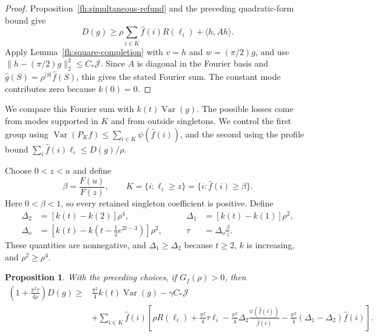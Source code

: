 \documentclass[11pt,letterpaper]{amsart}
\newcommand{\1}{\mathbf 1}
\DeclareMathOperator{\Var}{Var}
\newtheorem{proposition}[theorem]{Proposition}
\numberwithin{equation}{section}
\begin{document}
\begin{proof}
Proposition~\ref{fh:simultaneous-refund} and the preceding
quadratic-form bound give
\[
 D(g)\ge
 \rho\sum_{i\in K}\widehat f(i)R(\ell_i)+\langle h,Ah\rangle.
\]
Apply Lemma~\ref{fh:square-completion} with
$v=h$ and $w=(\pi/2)g$, and use
$\|h-(\pi/2)g\|_2^2\le C_*\mathcal J$.
Since $A$ is diagonal in the Fourier basis and
$\widehat g(S)=\rho^{|S|}\widehat f(S)$, this gives the stated
Fourier sum.
The constant mode contributes zero because $k(0)=0$.
\end{proof}

We compare this Fourier sum with $k(t)\Var(g)$.
The possible losses come from modes supported in $K$ and
from outside singletons.
We control the first group using
$\Var(P_Kf)\le\sum_{i\in K}\psi(\widehat f(i))$,
and the second using the profile bound
$\sum_i\widehat f(i)\ell_i\le D(g)/\rho$.

Choose $0<z<u$ and define
\begin{equation}\label{eq:retained-threshold}
 \beta=\frac{F(u)}{F(z)},
 \qquad
 K=\{i:\ell_i\ge z\}
  =\{i:\widehat f(i)\ge\beta\}.
\end{equation}
Here $0<\beta<1$, so every retained singleton coefficient
is positive.
Define
\begin{equation}\label{eq:spectral-corrections}
 \begin{aligned}
 \Delta_2&=[k(t)-k(2)]\rho^4,
 &\qquad \Delta_1&=[k(t)-k(1)]\rho^2,\\
 \Delta_o&=[k(t)-k(t-\tfrac12e^{2t-3})]\rho^2,
 &\qquad \tau&=\Delta_o\frac{\beta}{z}.
 \end{aligned}
\end{equation}
These quantities are nonnegative, and
$\Delta_1\ge\Delta_2$ because $t\ge2$, $k$ is increasing,
and $\rho^2\ge\rho^4$.

\begin{proposition}\label{as:master-ledger-equation}
With the preceding choices, if $G_f(\rho)>0$, then
\[
 \begin{aligned}
 \left(1+\frac{\pi^2\tau}{4\rho}\right)D(g)
 \ge{}&
 \frac{\pi^2}{4}k(t)\Var(g)-\gamma C_*\mathcal J\\
 &+\sum_{i\in K}\widehat f(i)
 \left[
   \rho R(\ell_i)+\frac{\pi^2}{4}\tau\ell_i
   -\frac{\pi^2}{4}\Delta_2
       \frac{\psi(\widehat f(i))}{\widehat f(i)}
   -\frac{\pi^2}{4}(\Delta_1-\Delta_2)\widehat f(i)
 \right].
 \end{aligned}
\]
\end{proposition}
\end{document}
